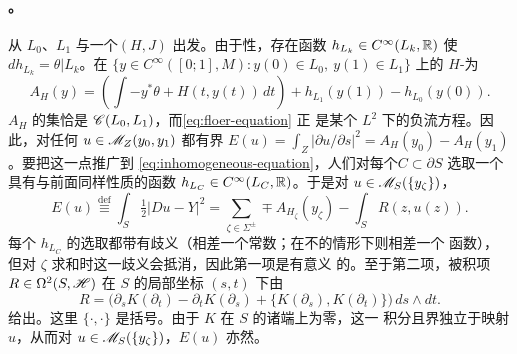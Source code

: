 \paragraph{\trEnergy。}\label{sub:energy}
从 $L_0$、$L_1$ 与一个\trFloerDatum{}$(H,J)$ 出发。由于\trExact{}性，存在函数
$h_{L_k}\in C^\infty(L_k,\mathbb{R})$ 使 $dh_{L_k}=\theta|L_k$。在\trPathSpace{}%
$\{y\in C^\infty([0;1],M):y(0)\in L_0,\ y(1)\in L_1\}$ 上的
$H$-\trPerturbation\trActionFunctional{}为
\begin{equation}\label{eq:perturbed-action}
A_H(y)=\left(\int -y^*\theta+H(t,y(t))\,dt\right)+h_{L_1}(y(1))-h_{L_0}(y(0)).
\end{equation}
$A_H$ 的\trCriticalPoint{}集恰是 $\mathscr{C}(L_0,L_1)$，而\eqref{eq:floer-equation} 正
是某个 $L^2$ \trMetric{}下的负\trGradient{}流方程。因此，对任何
$u\in\mathscr{M}_Z(y_0,y_1)$ 都有\trApriori{}界
$E(u)=\int_Z|\partial u/\partial s|^2=A_H(y_0)-A_H(y_1)$。要把这一点推广到
\eqref{eq:inhomogeneous-equation}，人们对每个\trConnectedComponent{}$C\subset
\partial S$ 选取一个具有与前面同样性质的函数 $h_{L_C}\in C^\infty(L_C,\mathbb{R})$。于是对
$u\in\mathscr{M}_S(\{y_\zeta\})$，
\begin{equation}\label{eq:energy-definition}
E(u)\stackrel{\mathrm{def}}{\equiv}\int_S\tfrac12|Du-Y|^2
=\sum_{\zeta\in\Sigma^\pm}\mp A_{H_\zeta}(y_\zeta)-\int_S R(z,u(z)).
\end{equation}
每个 $h_{L_C}$ 的选取都带有歧义（相差一个常数；在不\trConnected{}的情形下则相差一个%
\trLocallyConstant{}函数），但对 $\zeta$ 求和时这一歧义会抵消，因此第一项是有意义
的。至于第二项，\trCurvature{}被积项 $R\in\Omega^2(S,\mathscr{H})$ 在 $S$ 的局部坐标
$(s,t)$ 下由
\begin{equation*}
R=\bigl(\partial_sK(\partial_t)-\partial_tK(\partial_s)
+\{K(\partial_s),K(\partial_t)\}\bigr)\,ds\wedge dt.
\end{equation*}
给出。这里 $\{\cdot,\cdot\}$ 是\trPoisson{}括号。由于 $K$ 在 $S$ 的诸端上为零，这一
积分\trBounded{}且界独立于映射 $u$，从而对 $u\in\mathscr{M}_S(\{y_\zeta\})$，$E(u)$ 亦然。
